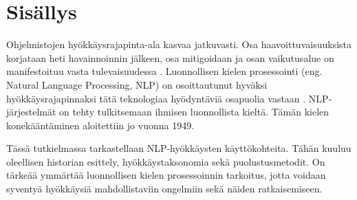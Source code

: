 \chapter{Sisällys\label{intro}}

Ohjelmistojen hyökkäysrajapinta-ala kasvaa jatkuvasti. Osa haavoittuvaisuuksista korjataan heti havainnoinnin jälkeen, osa mitigoidaan ja osan vaikutusalue on manifestoituu vasta tulevaisuudessa . Luonnollisen kielen prosessointi (eng. Natural Language Processing, NLP) on osoittautunut hyväksi hyökkäysrajapinnaksi tätä teknologiaa hyödyntäviä osapuolia vastaan \citep{boucher2021bad}. NLP-järjestelmät on tehty tulkitsemaan ihmisen luonnollista kieltä. Tämän kielen konekääntäminen aloitettiin jo vuonna 1949.

Tässä tutkielmassa tarkastellaan NLP-hyökkäysten käyttökohteita. Tähän kuuluu oleellisen historian esittely, hyökkäystaksonomia sekä puolustusmetodit. On tärkeää ymmärtää luonnollisen kielen prosessoinnin tarkoitus, jotta voidaan syventyä hyökkäysiä mahdollistaviin ongelmiin sekä näiden ratkaisemiseen.